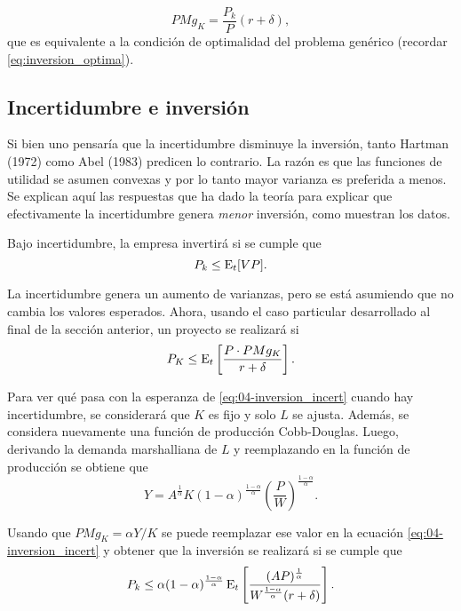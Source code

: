 \documentclass[DeGregorioResumen]{subfiles}
\begin{document}
\begin{equation}
PMg_K=\frac{P_k}{P}(r+\delta),
\end{equation}
que es equivalente a la condición de optimalidad del problema genérico (recordar \eqref{eq:inversion_optima}).

\subsection{Incertidumbre e inversión}

Si bien uno pensaría que la incertidumbre disminuye la inversión, tanto Hartman (1972) como Abel (1983) predicen lo contrario.
La razón es que las funciones de utilidad se asumen convexas y por lo tanto mayor varianza es preferida a menos. Se explican aquí las respuestas que ha dado la teoría para explicar que efectivamente la incertidumbre genera \emph{menor} inversión, como muestran los datos.

Bajo incertidumbre, la empresa invertirá si se cumple que
\begin{equation*}
P_k \leq \operatorname{E}_t[VP].
\end{equation*}

La incertidumbre genera un aumento de varianzas, pero se está asumiendo que no cambia los valores esperados. Ahora, usando el caso particular desarrollado al final de la sección anterior, un proyecto se realizará si
\begin{equation}
P_K \leq \operatorname{E}_t \left[\frac{P\cdot PMg_K}{r+\delta} \right].
\label{eq:04-inversion_incert}
\end{equation}

Para ver qué pasa con la esperanza de \eqref{eq:04-inversion_incert} cuando hay incertidumbre, se considerará que $K$ es fijo y solo $L$ se ajusta. Además, se considera nuevamente una función de producción Cobb-Douglas. Luego, derivando la demanda marshalliana de $L$ y reemplazando en la función de producción se obtiene que
\begin{equation*}
Y = A^{\frac{1}{\alpha}} K(1-\alpha)^{\frac{1-\alpha}{\alpha}} \left(\frac{P}{W} \right)^{\frac{1-\alpha}{\alpha}}.
\end{equation*}

Usando que $PMg_K=\alpha Y/K$ se puede reemplazar ese valor en la ecuación \eqref{eq:04-inversion_incert} y obtener que la inversión se realizará si se cumple que
\begin{equation}
P_k \leq \alpha(1-\alpha)^{\frac{1-\alpha}{\alpha}} \operatorname{E}_t \left[\frac{(AP)^{\frac{1}{\alpha}}}{W^{\frac{1-\alpha}{\alpha}}(r+\delta)}\right].
\end{equation}
\end{document}
